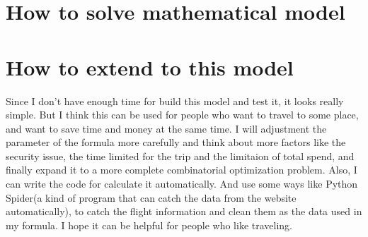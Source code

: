 \documentclass[12pt]{article}
\begin{document}
    \section{How to solve mathematical model}
    \section{How to extend to this model}
        Since I don't have enough time for build this model and test it, it looks really
        simple. But I think this can be used for people who want to travel to some place,
        and want to save time and money at the same time. I will adjustment the parameter
        of the formula more carefully and think about more factors like the security issue,
        the time limited for the trip and the limitaion of total spend, and finally expand
        it to a more complete combinatorial optimization problem. Also, I can write the
        code for calculate it automatically. And use some ways like Python Spider(a kind
        of program that can catch the data from the website automatically), to catch
        the flight information and clean them as the data used in my formula. I hope it
        can be helpful for people who like traveling.
\end{document}
